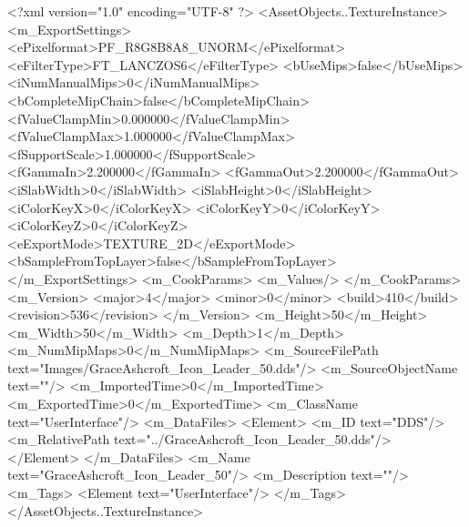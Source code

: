 <?xml version="1.0" encoding="UTF-8" ?>
<AssetObjects..TextureInstance>
	<m_ExportSettings>
		<ePixelformat>PF_R8G8B8A8_UNORM</ePixelformat>
		<eFilterType>FT_LANCZOS6</eFilterType>
		<bUseMips>false</bUseMips>
		<iNumManualMips>0</iNumManualMips>
		<bCompleteMipChain>false</bCompleteMipChain>
		<fValueClampMin>0.000000</fValueClampMin>
		<fValueClampMax>1.000000</fValueClampMax>
		<fSupportScale>1.000000</fSupportScale>
		<fGammaIn>2.200000</fGammaIn>
		<fGammaOut>2.200000</fGammaOut>
		<iSlabWidth>0</iSlabWidth>
		<iSlabHeight>0</iSlabHeight>
		<iColorKeyX>0</iColorKeyX>
		<iColorKeyY>0</iColorKeyY>
		<iColorKeyZ>0</iColorKeyZ>
		<eExportMode>TEXTURE_2D</eExportMode>
		<bSampleFromTopLayer>false</bSampleFromTopLayer>
	</m_ExportSettings>
	<m_CookParams>
		<m_Values/>
	</m_CookParams>
	<m_Version>
		<major>4</major>
		<minor>0</minor>
		<build>410</build>
		<revision>536</revision>
	</m_Version>
	<m_Height>50</m_Height>
	<m_Width>50</m_Width>
	<m_Depth>1</m_Depth>
	<m_NumMipMaps>0</m_NumMipMaps>
	<m_SourceFilePath text="Images/GraceAshcroft_Icon_Leader_50.dds"/>
	<m_SourceObjectName text=""/>
	<m_ImportedTime>0</m_ImportedTime>
	<m_ExportedTime>0</m_ExportedTime>
	<m_ClassName text="UserInterface"/>
	<m_DataFiles>
		<Element>
			<m_ID text="DDS"/>
			<m_RelativePath text="../GraceAshcroft_Icon_Leader_50.dds"/>
		</Element>
	</m_DataFiles>
	<m_Name text="GraceAshcroft_Icon_Leader_50"/>
	<m_Description text=""/>
	<m_Tags>
		<Element text="UserInterface"/>
	</m_Tags>
</AssetObjects..TextureInstance>
